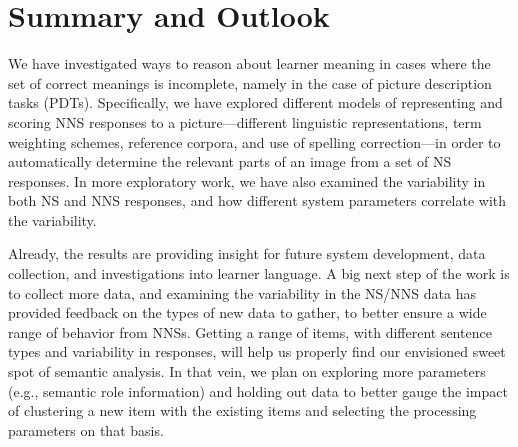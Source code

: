 \section{Summary and Outlook}

We have investigated ways to reason about learner meaning in cases
where the set of correct meanings is incomplete, namely in the
case of picture description tasks (PDTs).  Specifically, we have
explored different models of representing and scoring NNS responses to
a picture---different linguistic representations, term weighting
schemes, reference corpora, and use of spelling correction---in order
to automatically determine the relevant parts of an image from a set
of NS responses.  In more exploratory work, we have also examined the
variability in both NS and NNS responses, and how different system
parameters correlate with the variability.  

Already, the results are providing insight for future system
development, data collection, and investigations into learner
language.  A big next step of the work is to collect more data, and
examining the variability in the NS/NNS data has provided feedback on
the types of new data to gather, to better ensure a wide range of
behavior from NNSs.  Getting a range of items, with different sentence
types and variability in responses, will help us properly find our
envisioned sweet spot of semantic analysis.  In that vein, we plan on
exploring more parameters (e.g., semantic role information) and
holding out data to better gauge the impact of clustering a new item
with the existing items and selecting the processing parameters on
that basis.

